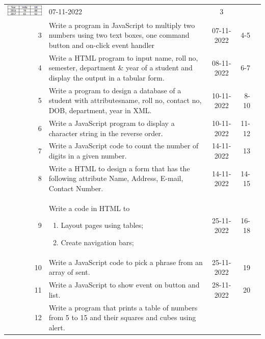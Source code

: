 \documentclass[oneside, a4paper]{memoir}
\begin{document}
{\begin{supertabular}{rp{8cm}crl}
        \vskip8pt
        \includegraphics[scale=0.7]{3} &
        07-11-2022 &
        3 \\
      3 &
        Write a program in JavaScript to multiply two numbers using two text boxes, one command button and on-click event handler &
        07-11-2022 &
        4-5 \\
      4 &
        Write a HTML program to input name, roll no, semester, department \& year of a student and display the output in a tabular form. &
        08-11-2022 &
        6-7 \\
      5 &
        Write a program to design a database of a student with attributesname, roll no, contact no, DOB, department, year in XML. &
        10-11-2022 &
        8-10 \\
      6 &
        Write a JavaScript program to display a character string in the reverse order. &
        10-11-2022 &
        11-12 \\
      7 &
        Write a JavaScript code to count the number of digits in a given number. &
        14-11-2022 &
        13 \\
      8 &
        Write a HTML to design a form that has the following attribute Name, Address, E-mail, Contact Number. &
        14-11-2022 &
        14-15 \\
      9 &
        Write a code in HTML to
        \begin{enumerate}
          \item Layout pages using tables;
          \item Create navigation bars;
        \end{enumerate}&
        25-11-2022 &
        16-18 \\
      10 &
        Write a JavaScript code to pick a phrase from an array of sent. &
        25-11-2022 &
        19 \\
      11 &
        Write a JavaScript to show event on button and list. &
        28-11-2022 &
        20 \\
      12 &
        Write a program that prints a table of numbers from 5 to 15 and their squares and cubes using alert. &

\end{supertabular}}
\end{document}
